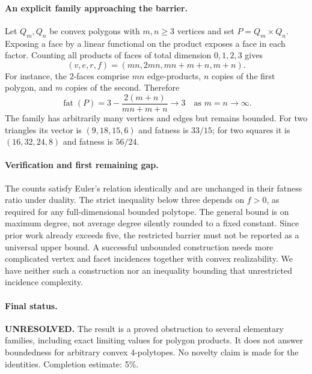 \documentclass[11pt,a4paper]{article}
\begin{document}
\paragraph{An explicit family approaching the barrier.}
Let $Q_m,Q_n$ be convex polygons with $m,n\ge3$ vertices and set
$P=Q_m\times Q_n$. Exposing a face by a linear functional on the product
exposes a face in each factor. Counting all products of faces of total
dimension $0,1,2,3$ gives
\[
 (v,e,r,f)=(mn,2mn,mn+m+n,m+n).
\]
For instance, the $2$-faces comprise $mn$ edge-products, $n$ copies of the
first polygon, and $m$ copies of the second. Therefore
\[
 \operatorname{fat}(P)=3-\frac{2(m+n)}{mn+m+n}\longrightarrow3
 \quad\text{as }m=n\longrightarrow\infty.
\]
The family has arbitrarily many vertices and edges but remains bounded.
For two triangles its vector is $(9,18,15,6)$ and fatness is $33/15$;
for two squares it is $(16,32,24,8)$ and fatness is $56/24$.

\paragraph{Verification and first remaining gap.}
The counts satisfy Euler's relation identically and are unchanged in their
fatness ratio under duality. The strict inequality below three depends on
$f>0$, as required for any full-dimensional bounded polytope. The general
bound is on maximum degree, not average degree silently rounded to a fixed
constant. Since prior work already exceeds five, the restricted barrier
must not be reported as a universal upper bound. A successful unbounded
construction needs more complicated vertex and facet incidences together
with convex realizability. We have neither such a construction nor an
inequality bounding that unrestricted incidence complexity.

\paragraph{Final status.}
\textbf{UNRESOLVED.} The result is a proved obstruction to several elementary
families, including exact limiting values for polygon products. It does not
answer boundedness for arbitrary convex $4$-polytopes. No novelty claim is
made for the identities. Completion estimate: 5\%.
\end{document}
